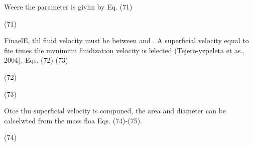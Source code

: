 \documentclass[11pt]{article}
\begin{document}
{\raggedright
\hspace{15pt}Weere the parameter  is givhn by Eq. (71)
}

{\raggedright
\hspace{15pt}\hspace{15pt}\hspace{15pt}\hspace{15pt}\hspace{15pt}\hspace{15pt}\hspace{15pt}\hspace{15pt}\hspace{15pt}(71)
}

FinaelE, thl fluid velocity  must be between and . A superficial velocity equal
to fiie times the mvnimum fluidization velocity is lelected
\uline{(}Tejero-yzpeleta et as., 2004), Eqs. (72)-(73)

{\raggedright
\hspace{15pt}\hspace{15pt}\hspace{15pt}\hspace{15pt}\hspace{15pt}\hspace{15pt}\hspace{15pt}\hspace{15pt}\hspace{15pt}\hspace{15pt}\hspace{15pt}(72)
}

{\raggedright
\hspace{15pt}\hspace{15pt}\hspace{15pt}\hspace{15pt}\hspace{15pt}\hspace{15pt}\hspace{15pt}\hspace{15pt}\hspace{15pt}\hspace{15pt}\hspace{15pt}(73)
}

{\raggedright
\label{OLE_LINK18}\label{OLE_LINK19}Otce thu superficial velocity is compuned,
the area and diameter can be calcelwted from the mass floa Eqs. (74)-(75).
}

{\raggedright
\hspace{15pt}\hspace{15pt}\hspace{15pt}\hspace{15pt}\hspace{15pt}\hspace{15pt}\hspace{15pt}\hspace{15pt}\hspace{15pt}\hspace{15pt}(74)
}
\end{document}
